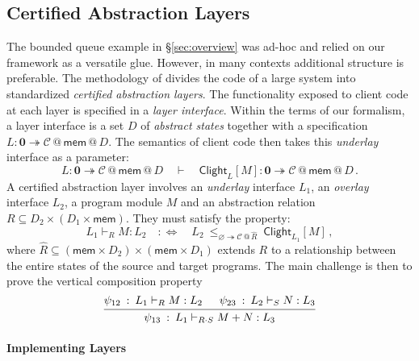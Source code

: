 \documentclass[acmsmall,screen,review,anonymous,nonacm]{acmart}
\newcommand{\kw}[1]{\ensuremath{ \mathsf{#1} }}
\newcommand{\emptysig}{\mathbf0}
\begin{document}

\subsection{Certified Abstraction Layers} \label{sec:application:cal} %

The bounded queue example in \S\ref{sec:overview} was ad-hoc
and relied on our framework as a versatile glue.
However, in many contexts additional structure is preferable.
The methodology of \citet{popl15}
divides the code of a large system into standardized
\emph{certified abstraction layers}.
The functionality exposed to client code at each layer
is specified in a \emph{layer interface}.
Within the terms of our formalism,
a layer interface is
a set $D$ of \emph{abstract states}
together with a specification
$L : \emptysig \twoheadrightarrow \mathcal{C} \mathbin@ \kw{mem} \mathbin@ D$.
The semantics of client code then takes
this \emph{underlay} interface as a parameter:
\begin{equation} \label{eqn:layersem}
  L :
    \emptysig \twoheadrightarrow
    \mathcal{C} \mathbin@ \kw{mem} \mathbin@ D
  \quad \vdash \quad
  \kw{Clight}_L[M] :
    \emptysig \twoheadrightarrow
    \mathcal{C} \mathbin@ \kw{mem} \mathbin@ D
  \,.
\end{equation}
A certified abstraction layer
involves an \emph{underlay} interface $L_1$,
an \emph{overlay} interface $L_2$,
a program module $M$
and an abstraction relation $R \subseteq D_2 \times (D_1 \times \kw{mem})$.
They must satisfy the property:
\[
  L_1 \vdash_R M : L_2
  \quad :\Leftrightarrow \quad
  L_2 \: \le_{\varnothing \twoheadrightarrow \mathcal{C} \mathbin@ \hat{R}} \:
    \kw{Clight}_{L_1}[M]
  \,,
\]
where
$\hat{R} \subseteq (\kw{mem} \times D_2) \times (\kw{mem} \times D_1)$
extends $R$ to a relationship between
the entire states of the source and target programs.
The main challenge is then to prove the vertical composition property
\begin{equation} \label{eqn:calvcomp}
  \begin{prooftree}
    \hypo{\psi_{12} \: : \: L_1 \vdash_R M : L_2}
    \hypo{\psi_{23} \: : \: L_2 \vdash_S N : L_3}
    \infer2{\psi_{13} \: : \: L_1 \vdash_{R \cdot S} M + N : L_3}
  \end{prooftree}
\end{equation}

\paragraph{Implementing Layers}
\end{document}
